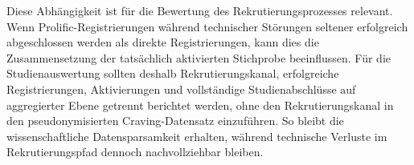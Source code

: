 \begin{neu}
Diese Abhängigkeit ist für die Bewertung des Rekrutierungsprozesses relevant. Wenn Prolific-Registrierungen während technischer Störungen seltener erfolgreich abgeschlossen werden als direkte Registrierungen, kann dies die Zusammensetzung der tatsächlich aktivierten Stichprobe beeinflussen. Für die Studienauswertung sollten deshalb Rekrutierungskanal, erfolgreiche Registrierungen, Aktivierungen und vollständige Studienabschlüsse auf aggregierter Ebene getrennt berichtet werden, ohne den Rekrutierungskanal in den pseudonymisierten Craving-Datensatz einzuführen. So bleibt die wissenschaftliche Datensparsamkeit erhalten, während technische Verluste im Rekrutierungspfad dennoch nachvollziehbar bleiben.
\end{neu}
